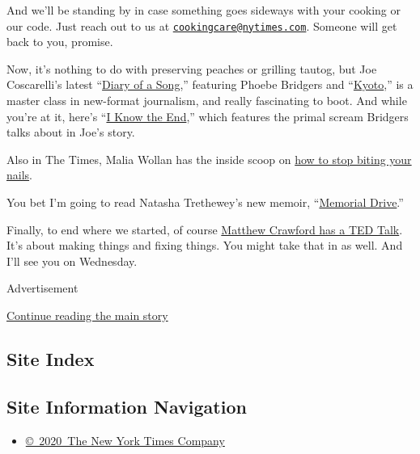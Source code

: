 And we'll be standing by in case something goes sideways with your
cooking or our code. Just reach out to us at
\href{mailto:cookingcare@nytimes.com}{\nolinkurl{cookingcare@nytimes.com}}.
Someone will get back to you, promise.

Now, it's nothing to do with preserving peaches or grilling tautog, but
Joe Coscarelli's latest
``\href{https://www.nytimes.com/2020/07/30/arts/music/phoebe-bridgers-kyoto.html}{Diary
of a Song},'' featuring Phoebe Bridgers and
``\href{https://www.youtube.com/watch?v=Tw0zYd0eIlk}{Kyoto},'' is a
master class in new-format journalism, and really fascinating to boot.
And while you're at it, here's
``\href{https://www.youtube.com/watch?v=WJ9-xN6dCW4}{I Know the End},''
which features the primal scream Bridgers talks about in Joe's story.

Also in The Times, Malia Wollan has the inside scoop on
\href{https://www.nytimes.com/2020/07/28/magazine/how-to-stop-biting-your-nails.html}{how
to stop biting your nails}.

You bet I'm going to read Natasha Trethewey's new memoir,
``\href{https://www.nytimes.com/2020/07/27/books/review-memorial-drive-memoir-natasha-trethewey.html}{Memorial
Drive}.''

Finally, to end where we started, of course
\href{https://www.youtube.com/watch?v=xdGky1JZovg}{Matthew Crawford has
a TED Talk}. It's about making things and fixing things. You might take
that in as well. And I'll see you on Wednesday.

Advertisement

\protect\hyperlink{after-bottom}{Continue reading the main story}

\hypertarget{site-index}{%
\subsection{Site Index}\label{site-index}}

\hypertarget{site-information-navigation}{%
\subsection{Site Information
Navigation}\label{site-information-navigation}}

\begin{itemize}
\tightlist
\item
  \href{https://help.nytimes.com/hc/en-us/articles/115014792127-Copyright-notice}{©~2020~The
  New York Times Company}
\end{itemize}

